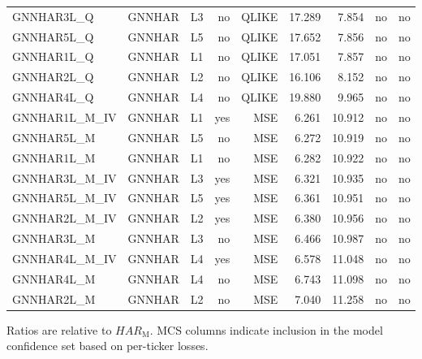 \documentclass[11pt,a4paper]{article}
\begin{document}
\begin{table}[H]
{\begin{tabular}{lrrrrrrrr}
GNNHAR3L\_Q & GNNHAR & L3 & no & QLIKE & 17.289 & 7.854 & no & no \\
GNNHAR5L\_Q & GNNHAR & L5 & no & QLIKE & 17.652 & 7.856 & no & no \\
GNNHAR1L\_Q & GNNHAR & L1 & no & QLIKE & 17.051 & 7.857 & no & no \\
GNNHAR2L\_Q & GNNHAR & L2 & no & QLIKE & 16.106 & 8.152 & no & no \\
GNNHAR4L\_Q & GNNHAR & L4 & no & QLIKE & 19.880 & 9.965 & no & no \\
GNNHAR1L\_M\_IV & GNNHAR & L1 & yes & MSE & 6.261 & 10.912 & no & no \\
GNNHAR5L\_M & GNNHAR & L5 & no & MSE & 6.272 & 10.919 & no & no \\
GNNHAR1L\_M & GNNHAR & L1 & no & MSE & 6.282 & 10.922 & no & no \\
GNNHAR3L\_M\_IV & GNNHAR & L3 & yes & MSE & 6.321 & 10.935 & no & no \\
GNNHAR5L\_M\_IV & GNNHAR & L5 & yes & MSE & 6.361 & 10.951 & no & no \\
GNNHAR2L\_M\_IV & GNNHAR & L2 & yes & MSE & 6.380 & 10.956 & no & no \\
GNNHAR3L\_M & GNNHAR & L3 & no & MSE & 6.466 & 10.987 & no & no \\
GNNHAR4L\_M\_IV & GNNHAR & L4 & yes & MSE & 6.578 & 11.048 & no & no \\
GNNHAR4L\_M & GNNHAR & L4 & no & MSE & 6.743 & 11.098 & no & no \\
GNNHAR2L\_M & GNNHAR & L2 & no & MSE & 7.040 & 11.258 & no & no \\
\bottomrule
\end{tabular}
}

\vspace{2pt}\begin{minipage}{0.98\textwidth}\footnotesize Ratios are relative to \(HAR_{\mathrm{M}}\). MCS columns indicate inclusion in the model confidence set based on per-ticker losses.\end{minipage}
\end{table}
\end{document}
